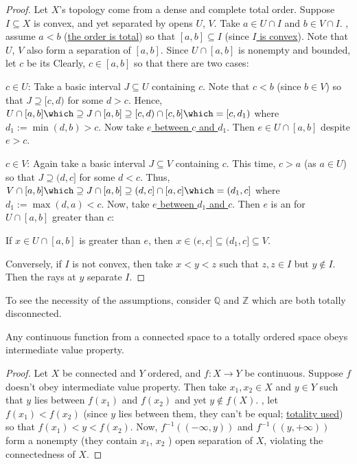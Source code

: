 	\begin{proof}
		Let $X$'s topology come from a dense and complete total order. Suppose $I\subseteq X$ is convex, and yet separated by opens $U$, $V$. Take $a\in U\cap I$ and $b\in V\cap I$. \Wlogg, assume $a < b$ (\uline{the order is total}) so that $[a, b]\subseteq I$ (since \uline{$I$ is convex}). Note that $U$, $V$ also form a separation of $[a, b]$. Since $U\cap [a, b]$ is nonempty and bounded, let $c$ be its \uline{\lub} Clearly, $c\in[a, b]$ so that there are two cases:
		\begin{mylist}
			\item[$c\in U$:] Take a basic interval $J\subseteq U$ containing $c$. Note that $c < b$ (since $b\in V$) so that $J\supseteq [c, d)$ for some $d > c$. Hence, $U\cap [a, b]\which\supseteq J\cap [a, b]\supseteq[c, d)\cap[c, b] \which= [c, d_1)$ where $d_1 :=  \min(d, b) > c$. Now take \uline{$e$ between $c$ and $d_1$}. Then $e\in U\cap[a, b]$ despite $e > c$.
			
			\item[$c\in V$:] Again take a basic interval $J\subseteq V$ containing $c$. This time, $c > a$ (as $a\in U$) so that $J\supseteq (d, c]$ for some $d < c$. Thus, $V\cap[a, b]\which\supseteq J\cap[a, b]\supseteq (d, c]\cap [a, c]\which=(d_1, c]$ where $d_1 := \max(d, a) < c$. Now, take \uline{$e$ between $d_1$ and $c$}. Then $e$ is an \ub for $U\cap[a, b]$ greater than $c$:
			\begin{subproof}
				If $x\in U\cap[a, b]$ is greater than $e$, then $x\in (e, c]\subseteq(d_1, c]\subseteq V$.
			\end{subproof}
		\end{mylist}
		
		Conversely, if $I$ is not convex, then take $x < y < z$ such that $z, z\in I$ but $y\notin I$. Then the rays at $y$ separate $I$.
	\end{proof}
	
	\begin{rmk}
		To see the necessity of the assumptions, consider $\mathbb Q$ and $\mathbb Z$ \resp which are both totally disconnected.
	\end{rmk}
	
	
	\begin{prp}
		Any continuous function from a connected space to a totally ordered space obeys intermediate value property.
	\end{prp}
	
	\begin{proof}
		Let $X$ be connected and $Y$ ordered, and $f\colon X\to Y$ be continuous. Suppose $f$ doesn't obey intermediate value property. Then take $x_1, x_2\in X$ and $y\in Y$ such that $y$ lies between $f(x_1)$ and $f(x_2)$ and yet $y\notin f(X)$. \Wlogg, let $f(x_1) < f(x_2)$ (since $y$ lies between them, they can't be equal; \uline{totality used}) so that $f(x_1) < y < f(x_2)$. Now, $f^{-1}((-\infty, y))$ and $f^{-1}((y, +\infty))$ form a nonempty (they contain $x_1$, $x_2$ \resp) open separation of $X$, violating the connectedness of $X$.
	\end{proof}
	
